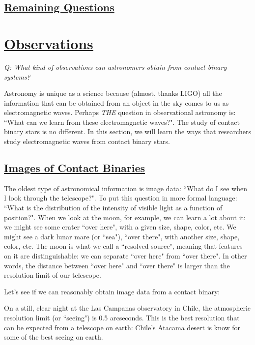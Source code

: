 \documentclass[12pt]{article} %
\numberwithin{equation}{section} %
\begin{document}
\subsection[Remaining Questions]{\hyperlink{toc}{Remaining Questions}} \label{sec: Remaining Questions}

\section[Observations]{\hyperlink{toc}{Observations}} \label{sec: observations}

\emph{Q: What kind of observations can astronomers obtain from contact binary systems?}

Astronomy is unique as a science because (almost, thanks LIGO) all the information that can be obtained from an object in the sky comes to us as electromagnetic waves. Perhaps \emph{THE} question in observational astronomy is: ``What can we learn from these electromagnetic waves?". The study of contact binary stars is no different. In this section, we will learn the ways that researchers study electromagnetic waves from contact binary stars.

\subsection[Images of Contact Binaries]{\hyperlink{toc}{Images of Contact Binaries}} \label{sec: Images of Contact Binaries}

The oldest type of astronomical information is image data: ``What do I see when I look through the telescope?". To put this question in more formal language: ``What is the distribution of the intensity of visible light as a function of position?". When we look at the moon, for example, we can learn a lot about it: we might see some crater ``over here", with a given size, shape, color, etc. We might see a dark lunar mare (or ``sea"), ``over there", with another size, shape, color, etc. The moon is what we call a ``resolved source", meaning that features on it are distinguishable: we can separate ``over here" from ``over there". In other words, the distance between ``over here" and ``over there" is larger than the resolution limit of our telescope.

Let's see if we can reasonably obtain image data from a contact binary:

On a still, clear night at the Las Campanas observatory in Chile, the atmospheric resolution limit (or ``seeing") is 0.5 arcseconds. This is the best resolution that can be expected from a telescope on earth: Chile's Atacama desert is know for some of the best seeing on earth.
\end{document}
